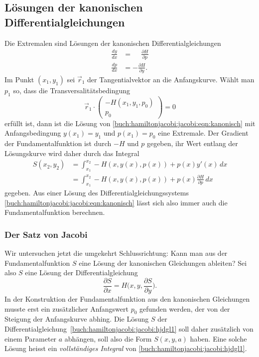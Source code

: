 %
%
\subsection{Lösungen der kanonischen Differentialgleichungen}
Die Extremalen sind Lösungen der kanonischen Differentialgleichungen
\begin{equation}
\begin{aligned}
\frac{dy}{dx}&=\phantom{-}\frac{\partial H}{\partial p}
\\
\frac{dp}{dx}&=-\frac{\partial H}{\partial y}.
\end{aligned}
\label{buch:hamiltonjacobi:jacobi:eqn:kanonisch}
\end{equation}
Im Punkt $(x_1,y_1)$ sei $\vec{r}_1$ der Tangentialvektor an die
Anfangskurve.
Wählt man $p_1$ so, dass die Transversalitätsbedingung
\[
\vec{r}_1
\cdot
\begin{pmatrix}
-H(x_1,y_1,p_0)\\
p_0
\end{pmatrix}
=
0
\]
erfüllt ist, dann ist die Lösung von
\eqref{buch:hamiltonjacobi:jacobi:eqn:kanonisch}
mit Anfangsbedingung $y(x_1)=y_1$ und $p(x_1)=p_0$ eine Extremale.
Der Gradient der Fundamentalfunktion ist durch $-H$ und $p$ gegeben,
ihr Wert entlang der Lösungskurve wird daher durch das Integral
\begin{align*}
S(x_2,y_2)
&=
\int_{x_1}^{x_2}
-H(x,y(x),p(x))
+
p(x) y'(x)
\,dx
\\
&=
\int_{x_1}^{x_2}
-H(x,y(x),p(x))
+
p(x)\frac{\partial H}{\partial p}
\,dx
\end{align*}
gegeben.
Aus einer Lösung des Differentialgleichungssystems
\eqref{buch:hamiltonjacobi:jacobi:eqn:kanonisch}
lässt sich also immer auch die Fundamentalfunktion berechnen.

%
%
\subsubsection{Der Satz von Jacobi}
Wir untersuchen jetzt die umgekehrt Schlussrichtung: Kann man aus
der Fundamentalfunktion $S$ eine Lösung der kanonischen Gleichungen 
ableiten?
Sei also $S$ eine Lösung der Differentialgleichung
\begin{equation}
\frac{\partial S}{\partial x}
=
H\biggl(x,y,\frac{\partial S}{\partial y}\biggr).
\label{buch:hamiltonjacobi:jacobi:hjdgl1}
\end{equation}
In der Konstruktion der Fundamentalfunktion aus den kanonischen Gleichungen
musste erst ein zusätzlicher Anfangswert $p_0$ gefunden werden,
der von der Steigung der Anfangskurve abhing.
Die Lösung $S$ der
Differentialgleichung~\eqref{buch:hamiltonjacobi:jacobi:hjdgl1}
soll daher zusätzlich von einem Parameter $a$ abhängen, soll also
die Form
\(
S(x,y,a)
\)
haben.
Eine solche Lösung heisst ein {\em vollständiges Integral} von
%
\eqref{buch:hamiltonjacobi:jacobi:hjdgl1}.

